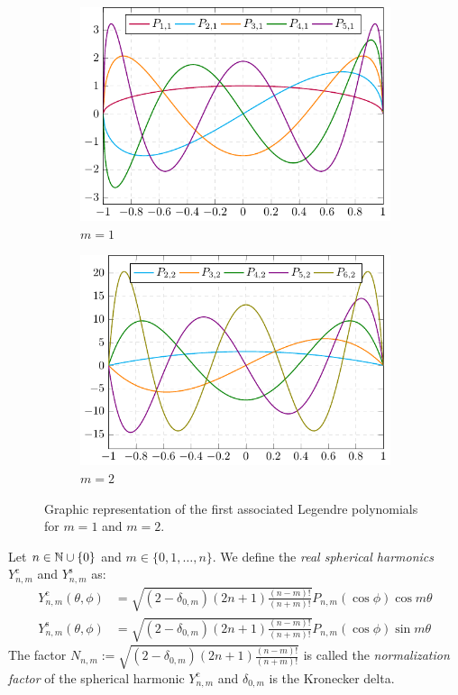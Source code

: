 \documentclass[../main.tex]{subfiles}
\begin{document}
\begin{figure}[ht]
  \centering
  \begin{subfigure}[b]{0.48\textwidth}
    \includegraphics[width=\textwidth]{Images/assolegendre1.pdf}
    \caption{$m=1$}
  \end{subfigure}
  \quad
  \begin{subfigure}[b]{0.48\textwidth}
    \includegraphics[width=\textwidth]{Images/assolegendre2.pdf}
    \caption{$m=2$}
  \end{subfigure}
  \caption{Graphic representation of the first associated Legendre polynomials for $m=1$ and $m=2$.}
\end{figure}
\begin{definition}
  Let $n\in\mathbb{N}\cup\{0\}$ and $m\in\{0,1,\dots,n\}$. We define the \emph{real spherical harmonics} $Y_{n,m}^{\mathrm{c}}$ and $Y_{n,m}^{\mathrm{s}}$ as:
  \begin{align}
    Y_{n,m}^{\mathrm{c}}(\theta,\phi) & =\sqrt{(2-\delta_{0,m})(2n+1)\frac{(n-m)!}{(n+m)!} }P_{n,m}(\cos\phi) \cos{m\theta} \\
    Y_{n,m}^{\mathrm{s}}(\theta,\phi) & =\sqrt{(2-\delta_{0,m})(2n+1)\frac{(n-m)!}{(n+m)!} }P_{n,m}(\cos\phi) \sin{m\theta}
  \end{align}
  The factor $N_{n,m}:=\sqrt{(2-\delta_{0,m})(2n+1)\frac{(n-m)!}{(n+m)!} }$ is called the \emph{normalization factor} of the spherical harmonic $Y_{n,m}^{\mathrm{c}}$ and $\delta_{0,m}$ is the Kronecker delta.
\end{definition}
\end{document}
